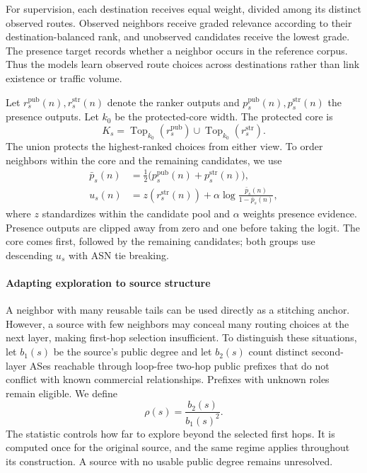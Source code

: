 For supervision, each destination receives equal weight, divided among
its distinct observed routes. Observed neighbors receive graded
relevance according to their destination-balanced rank, and unobserved
candidates receive the lowest grade. The presence target records whether
a neighbor occurs in the reference corpus. Thus the models learn
observed route choices across destinations rather than link
existence or traffic volume.

Let $r_s^{\mathrm{pub}}(n),r_s^{\mathrm{str}}(n)$ denote the ranker outputs
and $p_s^{\mathrm{pub}}(n),p_s^{\mathrm{str}}(n)$ the presence outputs.
Let $k_0$ be the protected-core width. The protected core is
\begin{equation}
K_s=\operatorname{Top}_{k_0}(r_s^{\mathrm{pub}})
       \cup\operatorname{Top}_{k_0}(r_s^{\mathrm{str}}).
\label{eq:protected_core}
\end{equation}
The union protects the highest-ranked choices from either view. To order
neighbors within the core and the remaining candidates, we use
\begin{equation}
\begin{split}
\bar p_s(n)&=\tfrac12\bigl(p_s^{\mathrm{pub}}(n)+p_s^{\mathrm{str}}(n)\bigr),\\
u_s(n)&=z(r_s^{\mathrm{str}}(n))+
                   \alpha\log\frac{\bar p_s(n)}{1-\bar p_s(n)},
\end{split}
\label{eq:neighbor_ranking}
\end{equation}
where $z$ standardizes within the candidate pool and $\alpha$ weights
presence evidence. Presence outputs are clipped away from zero and one
before taking the logit. The core comes first, followed by the remaining
candidates; both groups use descending $u_s$ with ASN tie breaking.

\paragraph{Adapting exploration to source structure}
A neighbor with many reusable tails can be used directly as a stitching
anchor. However, a source with few neighbors may conceal many routing
choices at the next layer, making first-hop selection insufficient. To
distinguish these situations, let $b_1(s)$ be the source's public degree
and let $b_2(s)$ count distinct second-layer ASes reachable through
loop-free two-hop public prefixes that do not conflict with known
commercial relationships. Prefixes with unknown roles remain eligible.
We define
\begin{equation}
\rho(s)=\frac{b_2(s)}{b_1(s)^2}.
\label{eq:source_rho}
\end{equation}
The statistic controls how far to explore beyond the selected first
hops. It is computed once for the original source, and the same regime
applies throughout its construction. A source with no usable public
degree remains unresolved.

